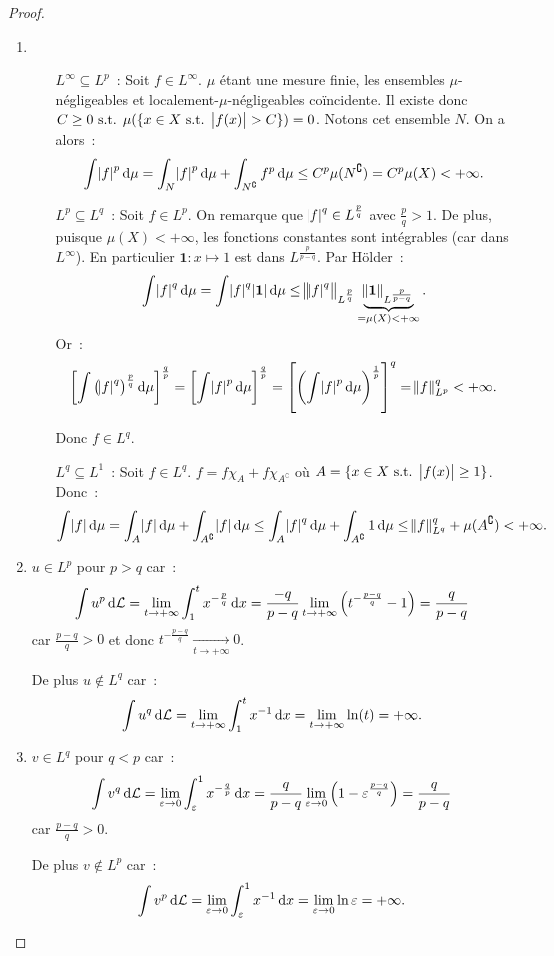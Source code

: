 \documentclass{article}
\theoremstyle{definition}
\newcommand{\pinfty}{{+\infty}}
\newcommand{\st}{\text{ s.t. }}
\newcommand{\C}{\complement}
\begin{document}
\begin{proof}~
\begin{enumerate}
	\item~
	\begin{itemize}
		\item[$L^\infty \subseteq L^p$~:] Soit $f \in L^\infty$. $\mu$ étant une mesure finie, les ensembles $\mu$-négligeables et localement-$\mu$-négligeables coïncidente.
		Il existe donc $C \geq 0 \st \mu(\{x \in X \st \abs {f(x)} > C\}) = 0$. Notons cet ensemble $N$. On a alors~:
		\[\int \abs f^p\dif\mu = \int_N\abs f^p\dif\mu + \int_{N^\C}f^p\dif\mu \leq C^p\mu(N^\C) = C^p\mu(X) < \pinfty.\]

		\item[$L^p \subseteq L^q$~:] Soit $f \in L^p$. On remarque que $\abs f^q \in L^{\frac pq}$ avec $\frac pq > 1$. De plus, puisque $\mu(X) < \pinfty$, les fonctions constantes
		sont intégrables  (car dans $L^\infty$). En particulier $\mathbf 1 : x \mapsto 1$ est dans $L^{\frac p{p-q}}$. Par Hölder~:
		\[\int\abs f^q\dif\mu = \int\abs f^q\abs {\mathbf 1}\dif\mu \leq \norm {\abs f^q}_{L^{\frac pq}}\underbrace {\norm {\mathbf 1}_{L^{\frac p{p-q}}}}_{= \mu(X) < \pinfty}.\]
		Or~:
		\[\left[\int \left(\abs f^q\right)^{\frac pq}\dif\mu\right]^{\frac qp} = \left[\int \abs f^p\dif\mu\right]^{\frac qp} = \left[\left(\int \abs f^p\dif\mu\right)^{\frac 1p}\right]^q
		= \norm f_{L^p}^q < \pinfty.\]

		Donc $f \in L^q$.

		\item[$L^q \subseteq L^1$~:] Soit $f \in L^q$. $f = f\chi_A + f\chi_{A^\C}$ où $A = \{x \in X \st \abs {f(x)} \geq 1\}$. Donc~:
		\[\int \abs f\dif\mu = \int_A\abs f\dif\mu + \int_{A^\C}\abs f\dif\mu \leq \int_A\abs f^q\dif\mu + \int_{A^\C}1\dif\mu \leq \norm f_{L^q}^q + \mu(A^\C) < \pinfty.\]
	\end{itemize}

	\item $u \in L^p$ pour $p > q$ car~:
	\[\int u^p\dif\mathcal L = \lim_{t \to \pinfty}\int_1^tx^{-\frac pq}\dif x = \frac {-q}{p-q}\lim_{t \to \pinfty}\left(t^{-\frac {p-q}q} - 1\right) = \frac q{p-q}\]
	car $\frac {p-q}q > 0$ et donc $t^{-\frac {p-q}q} \xrightarrow[t \to \pinfty]{} 0$.

	De plus $u \not \in L^q$ car~:
	\[\int u^q\dif\mathcal L = \lim_{t \to \pinfty}\int_1^tx^{-1}\dif x = \lim_{t \to \pinfty}\ln(t) = \pinfty.\]

	\item $v \in L^q$ pour $q < p$ car~:
	\[\int v^q\dif\mathcal L = \lim_{\varepsilon \to 0}\int_\varepsilon^1x^{-\frac qp}\dif x = \frac q{p-q}\lim_{\varepsilon \to 0}\left(1 - \varepsilon^{\frac {p-q}q}\right)
	= \frac q{p-q}\]
	car $\frac {p-q}q > 0$.

	De plus $v \not \in L^p$ car~:
	\[\int v^p\dif\mathcal L = \lim_{\varepsilon \to 0}\int_\varepsilon^1x^{-1}\dif x = \lim_{\varepsilon \to 0}\ln\varepsilon = \pinfty.\]
\end{enumerate}
\end{proof}
\end{document}

